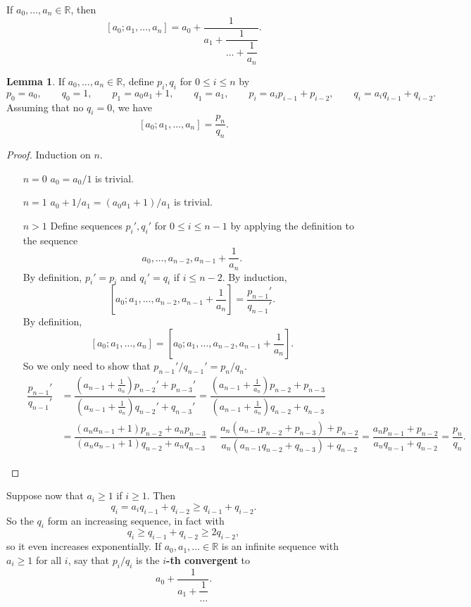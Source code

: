 \documentclass{article}
\newcommand{\R}{\mathbb{R}}
\newcommand{\rb}[1]{\left( #1 \right)}
\renewcommand{\sb}[1]{\left[ #1 \right]}
\theoremstyle{definition}\newtheorem{definition}{Definition}
\theoremstyle{definition}\newtheorem{remark}[definition]{Remark}
\theoremstyle{definition}\newtheorem*{example}{Example}
\theoremstyle{definition}\newtheorem*{note}{Note}
\newtheorem{lemma}[definition]{Lemma}
\begin{document}
If $ a_0, \dots, a_n \in \R $, then
$$ \sb{a_0; a_1, \dots, a_n} = a_0 + \dfrac{1}{a_1 + \dfrac{1}{\dots + \dfrac{1}{a_n}}}. $$

\begin{lemma}
\label{lem:68}
If $ a_0, \dots, a_n \in \R $, define $ p_i, q_i $ for $ 0 \le i \le n $ by
$$ p_0 = a_0, \qquad q_0 = 1, \qquad p_1 = a_0a_1 + 1, \qquad q_1 = a_1, \qquad p_i = a_ip_{i - 1} + p_{i - 2}, \qquad q_i = a_iq_{i - 1} + q_{i - 2}. $$
Assuming that no $ q_i = 0 $, we have
$$ \sb{a_0; a_1, \dots, a_n} = \dfrac{p_n}{q_n}. $$
\end{lemma}

\begin{proof}
Induction on $ n $.
\begin{itemize}[leftmargin=0.5in]
\item[$ n = 0 $] $ a_0 = a_0 / 1 $ is trivial.
\item[$ n = 1 $] $ a_0 + 1 / a_1 = \rb{a_0a_1 + 1} / a_1 $ is trivial.
\item[$ n > 1 $] Define sequences $ p_i', q_i' $ for $ 0 \le i \le n - 1 $ by applying the definition to the sequence
$$ a_0, \dots, a_{n - 2}, a_{n - 1} + \dfrac{1}{a_n}. $$
By definition, $ p_i' = p_i $ and $ q_i' = q_i $ if $ i \le n - 2 $. By induction,
$$ \sb{a_0; a_1, \dots, a_{n - 2}, a_{n - 1} + \dfrac{1}{a_n}} = \dfrac{p_{n - 1}'}{q_{n - 1}'}. $$
By definition,
$$ \sb{a_0; a_1, \dots, a_n} = \sb{a_0; a_1, \dots, a_{n - 2}, a_{n - 1} + \dfrac{1}{a_n}}. $$
So we only need to show that $ p_{n - 1}' / q_{n - 1}' = p_n / q_n $.
\begin{align*}
\dfrac{p_{n - 1}'}{q_{n - 1}'}
& = \dfrac{\rb{a_{n - 1} + \tfrac{1}{a_n}}p_{n - 2}' + p_{n - 3}'}{\rb{a_{n - 1} + \tfrac{1}{a_n}}q_{n - 2}' + q_{n - 3}'}
= \dfrac{\rb{a_{n - 1} + \tfrac{1}{a_n}}p_{n - 2} + p_{n - 3}}{\rb{a_{n - 1} + \tfrac{1}{a_n}}q_{n - 2} + q_{n - 3}} \\
& = \dfrac{\rb{a_na_{n - 1} + 1}p_{n - 2} + a_np_{n - 3}}{\rb{a_na_{n - 1} + 1}q_{n - 2} + a_nq_{n - 3}}
= \dfrac{a_n\rb{a_{n - 1}p_{n - 2} + p_{n - 3}} + p_{n - 2}}{a_n\rb{a_{n - 1}q_{n - 2} + q_{n - 3}} + q_{n - 2}}
= \dfrac{a_np_{n - 1} + p_{n - 2}}{a_nq_{n - 1} + q_{n - 2}}
= \dfrac{p_n}{q_n}.
\end{align*}
\end{itemize}
\end{proof}

Suppose now that $ a_i \ge 1 $ if $ i \ge 1 $. Then
$$ q_i = a_iq_{i - 1} + q_{i - 2} \ge q_{i - 1} + q_{i - 2}. $$
So the $ q_i $ form an increasing sequence, in fact with
$$ q_i \ge q_{i - 1} + q_{i - 2} \ge 2q_{i - 2}, $$
so it even increases exponentially. If $ a_0, a_1, \dots \in \R $ is an infinite sequence with $ a_i \ge 1 $ for all $ i $, say that $ p_i / q_i $ is the \textbf{$ i $-th convergent} to
$$ a_0 + \dfrac{1}{a_1 + \dfrac{1}{\dots}}. $$
\end{document}
